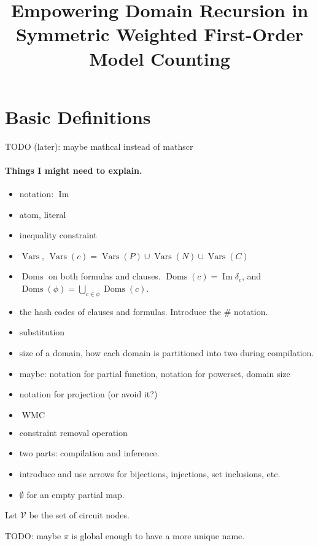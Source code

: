 \documentclass{article}
\title{Empowering Domain Recursion in Symmetric Weighted First-Order Model Counting}
\theoremstyle{definition}
\DeclareMathOperator{\Imm}{Im}
\DeclareMathOperator{\Doms}{Doms}
\DeclareMathOperator{\Vars}{Vars}
\DeclareMathOperator{\WMC}{WMC}
\begin{document}
\maketitle

\section{Basic Definitions}
 TODO (later): maybe mathcal instead of mathscr

\paragraph{Things I might need to explain.}
\begin{itemize}
\item notation: $\Imm$
\item atom, literal
\item inequality constraint
\item $\Vars$, $\Vars(c) = \Vars(P) \cup \Vars(N) \cup \Vars(C)$
\item $\Doms$ on both formulas and clauses. $\Doms(c) = \Imm \delta_c$, and $\Doms(\phi) = \bigcup_{c \in \phi} \Doms(c)$.
\item the hash codes of clauses and formulas. Introduce the $\#$ notation.
\item substitution
\item size of a domain, how each domain is partitioned into two during compilation.
\item maybe: notation for partial function, notation for powerset, domain size
\item notation for projection (or avoid it?)
\item $\WMC$
\item constraint removal operation
\item two parts: compilation and inference.
\item introduce and use arrows for bijections, injections, set inclusions, etc.
\item $\emptyset$ for an empty partial map.
\end{itemize}

Let $\mathscr{V}$ be the set of circuit nodes.

TODO: maybe $\pi$ is global enough to have a more unique name.
\end{document}
